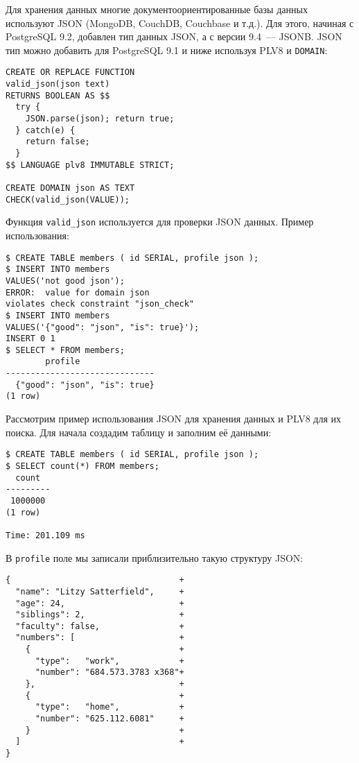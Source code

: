 Для хранения данных многие документоориентированные базы данных используют JSON (MongoDB, CouchDB, Couchbase и т.д.). Для этого, начиная с PostgreSQL 9.2, добавлен тип данных JSON, а с версии 9.4~--- JSONB. JSON тип можно добавить для PostgreSQL 9.1 и ниже используя PLV8 и \lstinline!DOMAIN!:

\begin{lstlisting}[label=lst:plv8js7,caption=Создание типа JSON]
CREATE OR REPLACE FUNCTION
valid_json(json text)
RETURNS BOOLEAN AS $$
  try {
    JSON.parse(json); return true;
  } catch(e) {
    return false;
  }
$$ LANGUAGE plv8 IMMUTABLE STRICT;

CREATE DOMAIN json AS TEXT
CHECK(valid_json(VALUE));
\end{lstlisting}

Функция \lstinline!valid_json! используется для проверки JSON данных. Пример использования:

\begin{lstlisting}[label=lst:plv8js8,caption=Проверка JSON]
$ CREATE TABLE members ( id SERIAL, profile json );
$ INSERT INTO members
VALUES('not good json');
ERROR:  value for domain json
violates check constraint "json_check"
$ INSERT INTO members
VALUES('{"good": "json", "is": true}');
INSERT 0 1
$ SELECT * FROM members;
	    profile
------------------------------
  {"good": "json", "is": true}
(1 row)
\end{lstlisting}

Рассмотрим пример использования JSON для хранения данных и PLV8 для их поиска. Для начала создадим таблицу и заполним её данными:

\begin{lstlisting}[label=lst:plv8js9,caption=Таблица с JSON полем]
$ CREATE TABLE members ( id SERIAL, profile json );
$ SELECT count(*) FROM members;
  count
---------
 1000000
(1 row)

Time: 201.109 ms
\end{lstlisting}

В \lstinline!profile! поле мы записали приблизительно такую структуру JSON:

\begin{lstlisting}[label=lst:plv8js10,caption=JSON структура]
{                                  +
  "name": "Litzy Satterfield",     +
  "age": 24,                       +
  "siblings": 2,                   +
  "faculty": false,                +
  "numbers": [                     +
    {                              +
      "type":   "work",            +
      "number": "684.573.3783 x368"+
    },                             +
    {                              +
      "type":   "home",            +
      "number": "625.112.6081"     +
    }                              +
  ]                                +
}
\end{lstlisting}

